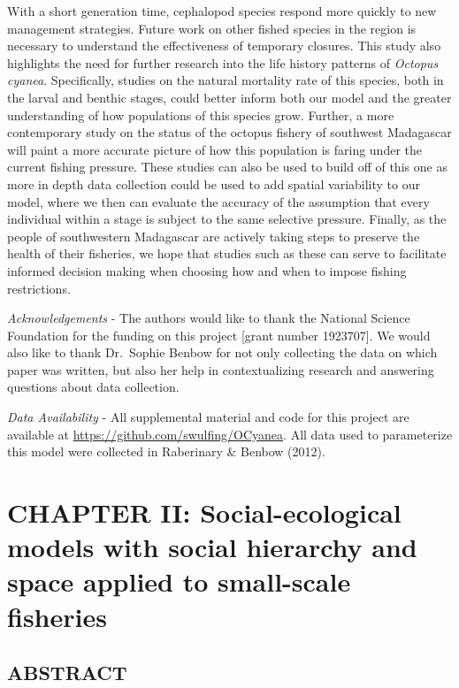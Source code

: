 \documentclass[
]{article}
\begin{document}
With a short generation time, cephalopod species respond more quickly to new management strategies. Future work on other fished species in the region is necessary to understand the effectiveness of temporary closures. This study also highlights the need for further research into the life history patterns of \emph{Octopus cyanea}. Specifically, studies on the natural mortality rate of this species, both in the larval and benthic stages, could better inform both our model and the greater understanding of how populations of this species grow. Further, a more contemporary study on the status of the octopus fishery of southwest Madagascar will paint a more accurate picture of how this population is faring under the current fishing pressure. These studies can also be used to build off of this one as more in depth data collection could be used to add spatial variability to our model, where we then can evaluate the accuracy of the assumption that every individual within a stage is subject to the same selective pressure. Finally, as the people of southwestern Madagascar are actively taking steps to preserve the health of their fisheries, we hope that studies such as these can serve to facilitate informed decision making when choosing how and when to impose fishing restrictions.

\emph{Acknowledgements} - The authors would like to thank the National Science Foundation for the funding on this project {[}grant number 1923707{]}. We would also like to thank Dr.~Sophie Benbow for not only collecting the data on which paper was written, but also her help in contextualizing research and answering questions about data collection.

\emph{Data Availability} - All supplemental material and code for this project are available at \url{https://github.com/swulfing/OCyanea}. All data used to parameterize this model were collected in Raberinary \& Benbow (2012).

\newpage

\hypertarget{chapter-ii-social-ecological-models-with-social-hierarchy-and-space-applied-to-small-scale-fisheries}{%
\section{CHAPTER II: Social-ecological models with social hierarchy and space applied to small-scale fisheries}\label{chapter-ii-social-ecological-models-with-social-hierarchy-and-space-applied-to-small-scale-fisheries}}

\hypertarget{abstract-2}{%
\subsection{ABSTRACT}\label{abstract-2}}
\end{document}
